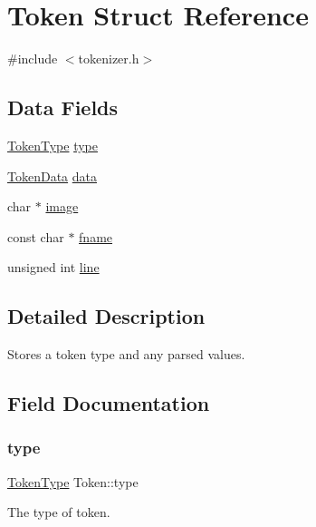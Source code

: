 \hypertarget{struct_token}{}\section{Token Struct Reference}
\label{struct_token}


{\ttfamily \#include $<$tokenizer.\+h$>$}

\subsection*{Data Fields}
\begin{DoxyCompactItemize}
\item 
\hyperlink{tokenizer_8h_aa520fbf142ba1e7e659590c07da31921}{Token\+Type} \hyperlink{struct_token_a67919af9f3a80dc0b28a0ab1e6d5bf8a}{type}
\item 
\hyperlink{union_token_data}{Token\+Data} \hyperlink{struct_token_a064a6753289db58ee17f722a10d15287}{data}
\item 
char $\ast$ \hyperlink{struct_token_aa33ebe86afc6f09ce9e335e062426b4a}{image}
\item 
const char $\ast$ \hyperlink{struct_token_a5f8c8d8ce49bdcca122fcd6aefc342fd}{fname}
\item 
unsigned int \hyperlink{struct_token_addf8630713f51d489c62396c97312f21}{line}
\end{DoxyCompactItemize}


\subsection{Detailed Description}
Stores a token type and any parsed values. 

\subsection{Field Documentation}
\mbox{\label{struct_token_a67919af9f3a80dc0b28a0ab1e6d5bf8a}} 
\subsubsection{\texorpdfstring{type}{type}}
{\footnotesize\ttfamily \hyperlink{tokenizer_8h_aa520fbf142ba1e7e659590c07da31921}{Token\+Type} Token\+::type}

The type of token. \mbox{\label{struct_token_a064a6753289db58ee17f722a10d15287}} 
